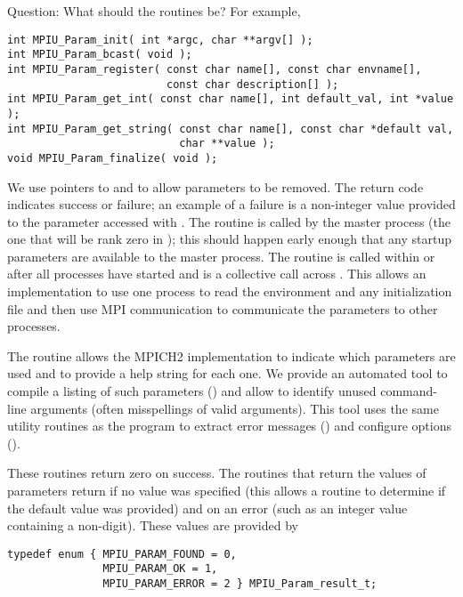 \documentclass{article}
\begin{document}
Question: What should the routines be?  For 
example,%
%
\begin{verbatim}
int MPIU_Param_init( int *argc, char **argv[] );
int MPIU_Param_bcast( void );
int MPIU_Param_register( const char name[], const char envname[], 
                         const char description[] );
int MPIU_Param_get_int( const char name[], int default_val, int *value );
int MPIU_Param_get_string( const char name[], const char *default val,
                           char **value );
void MPIU_Param_finalize( void );
\end{verbatim}
We use pointers to  and  to allow parameters to be
removed.  The return code indicates success or failure; an example of a
failure is a non-integer value provided to the parameter accessed with
. 
The routine  is called by the master process (the one
that will be rank zero in ); this should happen early
enough that any startup parameters are available to the master process.  The
routine  is called within  or
 after all processes have started and is a collective
call across .  This allows an implementation to use one
process to read the environment and any initialization file and then use MPI
communication to communicate the parameters to other processes.  

The routine  allows the MPICH2 implementation to
indicate which parameters are used and to provide a help string for each one.
We provide an automated tool to compile a listing of such parameters
() and
allow  to identify unused command-line arguments
(often misspellings of valid arguments).  This tool uses the same
utility routines as the program to extract error messages
() and configure options ().

These routines return zero on success.  The routines that return the values of
parameters return  if no value was specified (this
allows a routine to 
determine if the default value was provided) and
 on an error (such as an
integer value containing a non-digit).  These values are provided by
\begin{verbatim}
typedef enum { MPIU_PARAM_FOUND = 0, 
               MPIU_PARAM_OK = 1, 
               MPIU_PARAM_ERROR = 2 } MPIU_Param_result_t;
\end{verbatim}
\end{document}
